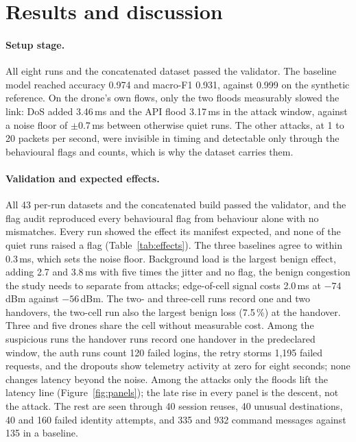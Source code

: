 \documentclass[10pt,twocolumn]{article}
\begin{document}
\section{Results and discussion}

\paragraph{Setup stage.} All eight runs and the concatenated dataset passed
the validator. The baseline model reached accuracy 0.974 and macro-F1 0.931,
against 0.999 on the synthetic reference. On the drone's own flows, only the
two floods measurably slowed the link: DoS added 3.46\,ms and the API flood
3.17\,ms in the attack window, against a noise floor of $\pm$0.7\,ms between
otherwise quiet runs. The other attacks, at 1 to 20 packets per second, were
invisible in timing and detectable only through the behavioural flags and
counts, which is why the dataset carries them.

\paragraph{Validation and expected effects.} All 43 per-run datasets and
the concatenated build passed the validator, and the flag audit reproduced
every behavioural flag from behaviour alone with no mismatches. Every run
showed the effect its manifest expected, and none of the quiet runs raised a
flag (Table~\ref{tab:effects}). The three baselines agree to within 0.3\,ms,
which sets the noise floor. Background load is the largest benign effect,
adding 2.7 and 3.8\,ms with five times the jitter and no flag, the benign
congestion the study needs to separate from attacks; edge-of-cell signal costs
2.0\,ms at $-74$\,dBm against $-56$\,dBm. The two- and three-cell runs record
one and two handovers, the two-cell run also the largest benign loss (7.5\,\%)
at the handover. Three and five drones share the cell without measurable cost.
Among the suspicious runs the handover runs record one handover in the
predeclared window, the auth runs count 120 failed logins, the retry storms
1,195 failed requests, and the dropouts show telemetry activity at zero for
eight seconds; none changes latency beyond the noise. Among the attacks only
the floods lift the latency line (Figure~\ref{fig:panels}); the late rise in
every panel is the descent, not the attack. The rest are seen through
40 session reuses, 40 unusual destinations, 40 and 160 failed identity
attempts, and 335 and 932 command messages against 135 in a baseline.
\end{document}
